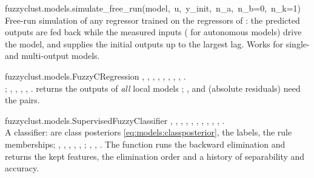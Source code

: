 \begin{apibox}{fuzzyclust.models.simulate\_free\_run(\allowbreak model,\allowbreak\ u,\allowbreak\ y\_init,\allowbreak\ n\_a,\allowbreak\ n\_b=0,\allowbreak\ n\_k=1)}
Free-run simulation of any regressor trained on the regressors of : the predicted outputs are fed back while the measured inputs  ( for autonomous models) drive the model, and  supplies the initial outputs up to the largest lag. Works for single- and multi-output models.
\end{apibox}

\begin{apibox}{fuzzyclust.models.FuzzyCRegression}
, , , , , , , , .\\
; , , , , .  returns the outputs of \emph{all} local models ; ,  and  (absolute residuals) need the pairs.
\end{apibox}

\begin{apibox}{fuzzyclust.models.SupervisedFuzzyClassifier}
, , , , , , , , , , .\\
A classifier:  are class posteriors \eqref{eq:models:classposterior},  the labels,  the rule memberships; , , ,  , , ; , , . The function  runs the backward elimination and returns the kept features, the elimination order and a history of separability and accuracy.
\end{apibox}

